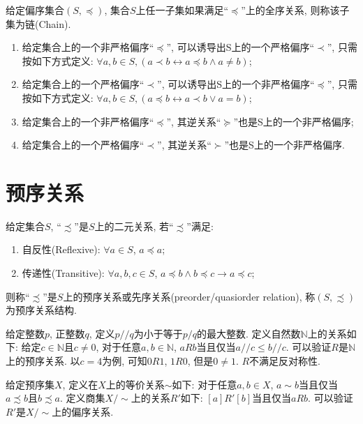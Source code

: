 \begin{definition}[链]
	给定偏序集合$(S,\preccurlyeq)$, 集合$S$上任一子集如果满足``$\preccurlyeq$''上的全序关系, 则称该子集为链(Chain).
\end{definition}

\begin{proposition}
	\begin{enumerate}
		\item 给定集合上的一个非严格偏序``$\preccurlyeq$'', 可以诱导出S上的一个严格偏序``$\prec$'', 只需按如下方式定义: $\forall a,b\in S, (a\prec b\leftrightarrow a\preccurlyeq b \wedge a\neq b)$;
		\item 给定集合上的一个严格偏序``$\prec$'', 可以诱导出S上的一个非严格偏序``$\preccurlyeq$'', 只需按如下方式定义: $\forall a,b\in S, (a\preccurlyeq b\leftrightarrow a\prec b \vee a=b)$;
		\item 给定集合上的一个非严格偏序``$\preccurlyeq$'', 其逆关系``$\succcurlyeq$''也是S上的一个非严格偏序;
		\item 给定集合上的一个严格偏序``$\prec$'', 其逆关系``$\succ$''也是S上的一个非严格偏序.
	\end{enumerate}
\end{proposition}

\section{预序关系}
\begin{definition}[预序关系]
	给定集合$S$, ``$\precsim$''是$S$上的二元关系, 若``$\precsim$''满足:
	\begin{enumerate}
		\item 自反性(Reflexive): $\forall a\in S$, $a\preccurlyeq a$;
		\item 传递性(Transitive): $\forall a,b,c\in S$, $a\preccurlyeq b\wedge b\preccurlyeq c\rightarrow a\preccurlyeq c$;
	\end{enumerate}
	则称``$\precsim$''是$S$上的预序关系或先序关系(preorder/quasiorder relation), 称$(S,\precsim)$为预序关系结构.
\end{definition}

给定整数$p$, 正整数$q$, 定义$p//q$为小于等于$p/q$的最大整数. 定义自然数$\mathbb N$上的关系如下: 给定$c\in \mathbb N$且$c\neq 0$, 对于任意$a,b\in \mathbb N$, $aRb$当且仅当$a//c\leqslant b//c$. 可以验证$R$是$\mathbb N$上的预序关系. 以$c=4$为例, 可知$0R1$, $1R0$, 但是$0\neq 1$. $R$不满足反对称性.

给定预序集$X$, 定义在$X$上的等价关系$\sim$如下: 对于任意$a,b\in X$, $a\sim b$当且仅当$a\precsim b$且$b\precsim a$. 定义商集$X/\sim$上的关系$R'$如下: $[a]R'[b]$当且仅当$aRb$. 可以验证$R'$是$X/\sim$上的偏序关系.

